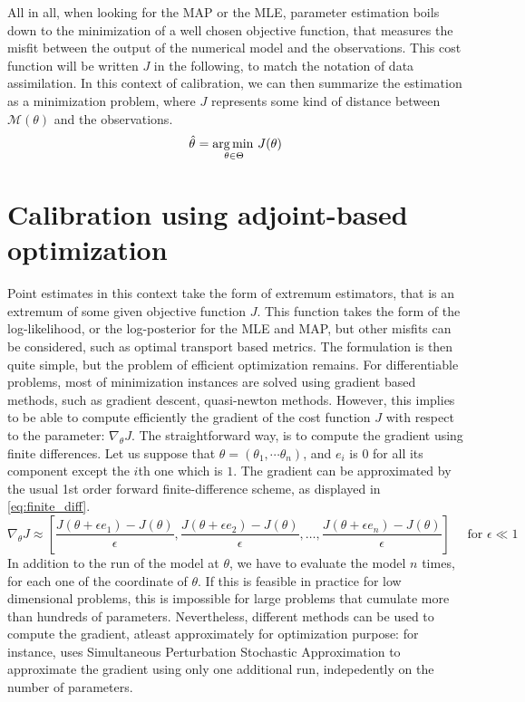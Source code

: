\documentclass[../../Main_ManuscritThese.tex]{subfiles}
\begin{document}
All in all, when looking for the MAP or the MLE, parameter estimation boils down to the minimization of a well chosen objective function, that measures the misfit between the output of the numerical model and the observations. This cost function will be written $J$ in the following, to match the notation of data assimilation. 
In this context of calibration, we can then summarize the estimation as a minimization problem, where $J$ represents some kind of distance between $\mathcal{M}(\theta)$ and the observations.
\begin{equation}
  \hat{\theta}_{\mathrm{}} = \operatorname*{arg\,min \,}_{\theta\in \Theta} J(\theta)
\end{equation}

\section{Calibration using adjoint-based optimization}
\label{sec:calibration_adjoint_optimization}
Point estimates in this context take the form of extremum estimators, that is an extremum of some given objective function $J$. This function takes the form of the log-likelihood, or the log-posterior for the MLE and MAP, but other misfits can be considered, such as optimal transport based metrics. The formulation is then quite simple, but the problem of efficient optimization remains. For differentiable problems, most of minimization instances are solved using gradient based methods, such as gradient descent, quasi-newton methods.
However, this implies to be able to compute efficiently the gradient of the cost function $J$ with respect to the parameter: $\nabla_{\theta} J$. The straightforward way, is to compute the gradient using finite differences. Let us suppose that $\theta = (\theta_1,\cdots \theta_n)$, and $e_i$ is 0 for all its component except the $i$th one which is $1$. The gradient can be approximated by the usual 1st order forward finite-difference scheme, as displayed in \cref{eq:finite_diff}.
\begin{equation}
  \label{eq:finite_diff}
  \nabla_{\theta} J  \approx \left[\frac{J(\theta + \epsilon e_1) - J(\theta)}{\epsilon}, \frac{J(\theta + \epsilon e_2) - J(\theta)}{ \epsilon},\dots, \frac{J(\theta + \epsilon e_n)- J(\theta)}{\epsilon} \right] \quad \text{ for } \epsilon \ll 1
\end{equation}
In addition to the run of the model at $\theta$, we have to evaluate the model $n$ times, for each one of the coordinate of $\theta$. If this is feasible in practice for low dimensional problems, this is impossible for large problems that cumulate more than hundreds of parameters. Nevertheless, different methods can be used to compute the gradient, atleast approximately for optimization purpose: for instance, \cite{boutet_estimation_2015} uses Simultaneous Perturbation Stochastic Approximation to approximate the gradient using only one additional run, indepedently on the number of parameters.
\end{document}
